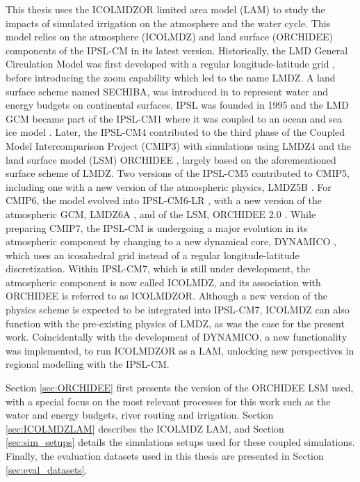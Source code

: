 This thesis uses the ICOLMDZOR limited area model (LAM) to study the impacts of simulated irrigation on the atmosphere and the water cycle. This model relies on the atmosphere (ICOLMDZ) and land surface (ORCHIDEE) components of the IPSL-CM in its latest version. 
Historically, the LMD General Circulation Model was first developed with a regular longitude-latitude grid \citep{sadourny_laval_1984}, before introducing the zoom capability \citep{krinner_studies_1997, li_ensemble_1999} which led to the name LMDZ. 
A land surface scheme named SECHIBA, was introduced in \citet{ducoudre_sechiba_1993} to represent water and energy budgets on continental surfaces. 
IPSL was founded in 1995 and the LMD GCM became part of the IPSL-CM1 where it was coupled to an ocean and sea ice model \citep{braconnot_adjustment_1997}.
Later, the IPSL-CM4 contributed to the third phase of the Coupled Model Intercomparison Project (CMIP3) with simulations using LMDZ4 \citep{hourdin_lmdz4_2006} and the land surface model (LSM) ORCHIDEE \citep{krinner_dynamic_2005}, largely based on the aforementioned surface scheme of LMDZ.
Two versions of the IPSL-CM5 contributed to CMIP5, including one with a new version of the atmospheric physics, LMDZ5B \citep{hourdin_lmdz5b_2013}.
For CMIP6, the model evolved into IPSL-CM6-LR \citep{boucher_presentation_2020}, with a new version of the atmospheric GCM, LMDZ6A \citep{hourdin_lmdz6a_2020}, and of the LSM, ORCHIDEE 2.0 \citep{cheruy_improved_2020}. 
While preparing CMIP7, the IPSL-CM is undergoing a major evolution in its atmospheric component by changing to a new dynamical core, DYNAMICO \citep{dubos_dynamico-10_2015}, which uses an icosahedral grid instead of a regular longitude-latitude discretization. Within IPSL-CM7, which is still under development, the atmospheric component is now called ICOLMDZ, and its association with ORCHIDEE is referred to as ICOLMDZOR. Although a new version of the physics scheme is expected to be integrated into IPSL-CM7, ICOLMDZ can also function with the pre-existing physics of LMDZ, as was the case for the present work. 
Coincidentally with the development of DYNAMICO, a new functionality was implemented, to run ICOLMDZOR as a LAM, unlocking new perspectives in regional modelling with the IPSL-CM. 

Section \ref{sec:ORCHIDEE} first presents the version of the ORCHIDEE LSM used, with a special focus on the most relevant processes for this work such as the water and energy budgets, river routing and irrigation. 
Section \ref{sec:ICOLMDZLAM} describes the ICOLMDZ LAM, and Section \ref{sec:sim_setups} details the simulations setups used for these coupled simulations. 
Finally, the evaluation datasets used in this thesis are presented in Section \ref{sec:eval_datasets}.


